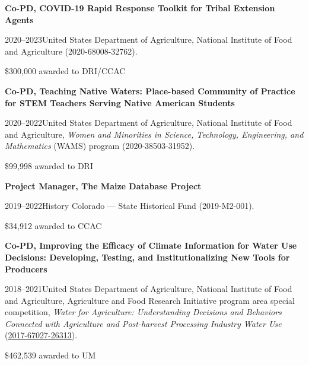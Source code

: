{\bf Co-PD, COVID-19 Rapid Response Toolkit for Tribal Extension Agents}
\begin{list1}
\item[] 2020–2023\hspace{.2cm}United States Department of Agriculture, National Institute of Food and Agriculture (2020-68008-32762).
\item[] \$300,000 awarded to DRI/CCAC
\end{list1}


{\bf Co-PD, Teaching Native Waters: Place-based Community of Practice for STEM Teachers Serving Native American Students}
\begin{list1}
\item[] 2020–2022\hspace{.2cm}United States Department of Agriculture, National Institute of Food and Agriculture, \emph{Women and Minorities in Science, Technology, Engineering, and Mathematics} (WAMS) program (2020-38503-31952).
\item[] \$99,998 awarded to DRI
\end{list1}


{\bf Project Manager, The Maize Database Project}
\begin{list1}
\item[] 2019–2022\hspace{.2cm}History Colorado — State Historical Fund (2019-M2-001).
\item[] \$34,912 awarded to CCAC
\end{list1}


{\bf Co-PD, Improving the Efficacy of Climate Information for Water Use Decisions: Developing, Testing, and Institutionalizing New Tools for Producers}
\begin{list1}
\item[] 2018–2021\hspace{.2cm}United States Department of Agriculture, National Institute of Food and Agriculture, Agriculture and Food Research Initiative program area special competition, \emph{Water for Agriculture: Understanding Decisions and Behaviors Connected with Agriculture and Post-harvest Processing Industry Water Use} (\href{https://climate.umt.edu/mtdrought/}{2017-67027-26313}).
\item[] \$462,539 awarded to UM
\end{list1}


